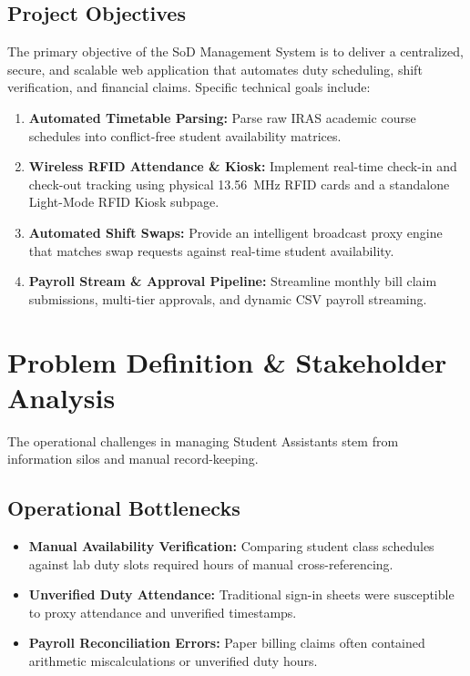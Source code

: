 \documentclass[10pt,a4paper,twocolumn,fleqn]{article}
\begin{document}
\subsection{Project Objectives}
The primary objective of the SoD Management System is to deliver a centralized, secure, and scalable web application that automates duty scheduling, shift verification, and financial claims. Specific technical goals include:
\begin{enumerate}
    \item \textbf{Automated Timetable Parsing:} Parse raw IRAS academic course schedules into conflict-free student availability matrices.
    \item \textbf{Wireless RFID Attendance \& Kiosk:} Implement real-time check-in and check-out tracking using physical 13.56~MHz RFID cards and a standalone Light-Mode RFID Kiosk subpage.
    \item \textbf{Automated Shift Swaps:} Provide an intelligent broadcast proxy engine that matches swap requests against real-time student availability.
    \item \textbf{Payroll Stream \& Approval Pipeline:} Streamline monthly bill claim submissions, multi-tier approvals, and dynamic CSV payroll streaming.
\end{enumerate}

\section{Problem Definition \& Stakeholder Analysis}
The operational challenges in managing Student Assistants stem from information silos and manual record-keeping.

\subsection{Operational Bottlenecks}
\begin{itemize}
    \item \textbf{Manual Availability Verification:} Comparing student class schedules against lab duty slots required hours of manual cross-referencing.
    \item \textbf{Unverified Duty Attendance:} Traditional sign-in sheets were susceptible to proxy attendance and unverified timestamps.
    \item \textbf{Payroll Reconciliation Errors:} Paper billing claims often contained arithmetic miscalculations or unverified duty hours.
\end{itemize}
\end{document}
